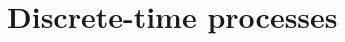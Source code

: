 \documentclass[../main.tex]{subfiles}
\begin{document}
\section{Discrete-time processes}\label{sec1}


\end{document}
